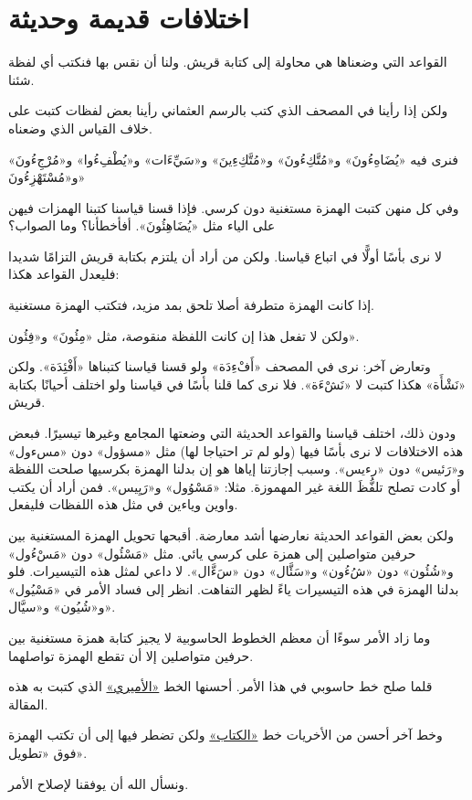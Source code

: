 \documentclass[
  english,
  10pt,
]{article}
\begin{document}
\section{\texorpdfstring{\foreignlanguage{arabic}{\altfamily اختلافات
قديمة
وحديثة}}{اختلافات قديمة وحديثة}}\label{ux627ux62eux62aux644ux627ux641ux627ux62a-ux642ux62fux64aux645ux629-ux648ux62dux62fux64aux62bux629}

\begin{otherlanguage}{arabic}

\altfamily 

القواعد التي وضعناها هي محاولة إلى كتابة قريش. ولنا أن نقس بها فنكتب أي
لفظة شئنا.

ولكن إذا رأينا في المصحف الذي كتب بالرسم العثماني رأينا بعض لفظات كتبت
على خلاف القياس الذي وضعناه.

فنرى فيه «يُضَاهِءُونَ» و«مُتَّكِءُونَ» و«مُتَّكِءِينَ» و«سَيِّءَات» و«يُطْفِءُوا» و«مُرْجِءُونَ»
و«مُسْتَهْزِءُونَ»

وفي كل منهن كتبت الهمزة مستغنية دون كرسي. فإذا قسنا قياسنا كتبنا الهمزات
فيهن على الياء مثل «يُضَاهِئُونَ». أفأخطأنا؟ وما الصواب؟

لا نرى بأسًا أولًّا في اتباع قياسنا. ولكن من أراد أن يلتزم بكتابة قريش
التزامًا شديدا فليعدل القواعد هكذا:

إذا كانت الهمزة متطرفة أصلا تلحق بمد مزيد، فتكتب الهمزة مستغنية.

ولكن لا تفعل هذا إن كانت اللفظة منقوصة، مثل «مِئُونَ» و«فِئُون».

وتعارض آخر: نرى في المصحف «أَفْءِدَة» ولو قسنا قياسنا كتبناها «أَفْئِدَة». ولكن
«نَشْأَة» هكذا كتبت لا «نَشْءَة». فلا نرى كما قلنا بأسًا في قياسنا ولو اختلف
أحيانًا بكتابة قريش.

ودون ذلك، اختلف قياسنا والقواعد الحديثة التي وضعتها المجامع وغيرها
تيسيرًا. فبعض هذه الاختلافات لا نرى بأسًا فيها (ولو لم تر احتياجا لها) مثل
«مسؤول» دون «مسءول» و«رَئيس» دون «رءيس». وسبب إجازتنا إياها هو إن بدلنا
الهمزة بكرسيها صلحت اللفظة أو كادت تصلح تلفُّظَ اللغة غير المهموزة. مثلا:
«مَسْوُول» و«رَيِيس». فمن أراد أن يكتب واوين وياءين في مثل هذه اللفظات
فليفعل.

ولكن بعض القواعد الحديثة نعارضها أشد معارضة. أقبحها تحويل الهمزة
المستغنية بين حرفين متواصلين إلى همزة على كرسي يائي. مثل «مَسْئُول» دون
«مَسْءُول» و«شُئُون» دون «شُءُون» و«سَئَّال» دون «سَءَّال». لا داعي لمثل هذه
التيسيرات. فلو بدلنا الهمزة في هذه التيسيرات ياءً لظهر التفاهت. انظر إلى
فساد الأمر في «مَسْيُول» و«شُيُون» و«سيَّال».

وما زاد الأمر سوءًا أن معظم الخطوط الحاسوبية لا يجيز كتابة همزة مستغنية
بين حرفين متواصلين إلا أن تقطع الهمزة تواصلهما.

قلما صلح خط حاسوبي في هذا الأمر. أحسنها الخط
\href{https://github.com/aliftype/amiri}{«الأميري»} الذي كتبت به هذه
المقالة.

وخط آخر أحسن من الأخريات خط
\href{https://github.com/nuqayah/kitab-font}{«الكتاب»} ولكن تضطر فيها
إلى أن تكتب الهمزة فوق «تطويل».

ونسأل الله أن يوفقنا لإصلاح الأمر.

\end{otherlanguage}
\end{document}
